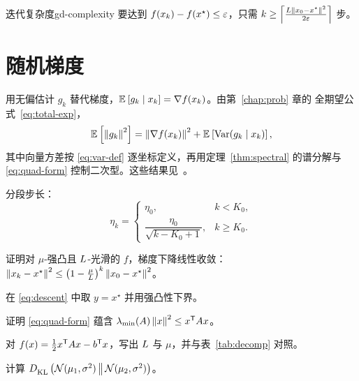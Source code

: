 \begin{corollary}{迭代复杂度}{gd-complexity}
  要达到 $f(x_k) - f(x^\star) \le \eps$，只需 $k \ge \ceil*{\frac{\Lip \norm{x_0 - x^\star}^2}{2\eps}}$ 步。
\end{corollary}

\section{随机梯度}\label{sec:sgd}

用无偏估计 $g_k$ 替代梯度，$\E{g_k \given x_k} = \grad f(x_k)$。由第~\ref{chap:prob} 章的
全期望公式~\eqref{eq:total-exp}，
\begin{equation}\label{eq:sgd-var}
  \E{\norm{g_k}^2} = \norm{\grad f(x_k)}^2 + \E{\Var(g_k \given x_k)},
\end{equation}
其中向量方差按 \eqref{eq:var-def} 逐坐标定义，再用定理~\ref{thm:spectral} 的谱分解与
\eqref{eq:quad-form} 控制二次型。这些结果见~\cite{chen2018sgd,zhang2020notes}。

分段步长：
\begin{equation}\label{eq:schedule}
  \eta_k =
  \begin{cases}
    \eta_0, & k < K_0, \\[2pt]
    \dfrac{\eta_0}{\sqrt{k - K_0 + 1}}, & k \ge K_0.
  \end{cases}
\end{equation}

\begin{exercise}
  证明对 $\mu$-强凸且 $\Lip$-光滑的 $f$，梯度下降线性收敛：
  $\norm{x_k - x^\star}^2 \le \left(1 - \frac{\mu}{\Lip}\right)^k \norm{x_0 - x^\star}^2$。
\end{exercise}

\begin{solution}
  在 \eqref{eq:descent} 中取 $y = x^\star$ 并用强凸性下界。
\end{solution}

\begin{problemset}
  \item 证明 \eqref{eq:quad-form} 蕴含 $\lambda_{\min}(A) \norm{x}^2 \le x\T A x$。
  \item 对 $f(x) = \frac12 x\T A x - b\T x$，写出 $\Lip$ 与 $\mu$，并与表~\ref{tab:decomp} 对照。
  \item 计算 $\KL{\mathcal{N}(\mu_1, \sigma^2)}{\mathcal{N}(\mu_2, \sigma^2)}$。
\end{problemset}
